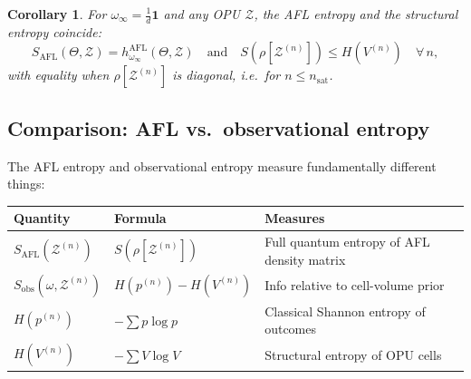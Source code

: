 \documentclass[12pt,a4paper]{article}
\newtheorem{corollary}[theorem]{Corollary}
\begin{document}
\begin{corollary}
For $\omega_\infty = \frac{1}{d}\mathbf{1}$ and any OPU $\mathcal{Z}$, the
AFL entropy and the structural entropy coincide:
\[
  S_{\mathrm{AFL}}(\Theta,\mathcal{Z}) = h_{\omega_\infty}^{\mathrm{AFL}}(\Theta,\mathcal{Z})
  \quad\text{and}\quad
  S(\rho[\mathcal{Z}^{(n)}]) \leq H(V^{(n)})
  \quad\forall\,n,
\]
with equality when $\rho[\mathcal{Z}^{(n)}]$ is diagonal, i.e.\ for $n \leq n_{\mathrm{sat}}$.
\end{corollary}

\subsection{Comparison: AFL vs.\ observational entropy}

The AFL entropy and observational entropy measure fundamentally different things:

\begin{center}
\begin{tabular}{lll}
\hline
Quantity & Formula & Measures \\
\hline
$S_{\mathrm{AFL}}(\mathcal{Z}^{(n)})$ & $S(\rho[\mathcal{Z}^{(n)}])$ & Full quantum entropy of AFL density matrix \\
$S_{\mathrm{obs}}(\omega,\mathcal{Z}^{(n)})$ & $H(p^{(n)})-H(V^{(n)})$ & Info relative to cell-volume prior \\
$H(p^{(n)})$ & $-\sum p\log p$ & Classical Shannon entropy of outcomes \\
$H(V^{(n)})$ & $-\sum V\log V$ & Structural entropy of OPU cells \\
\hline
\end{tabular}
\end{center}
\end{document}
